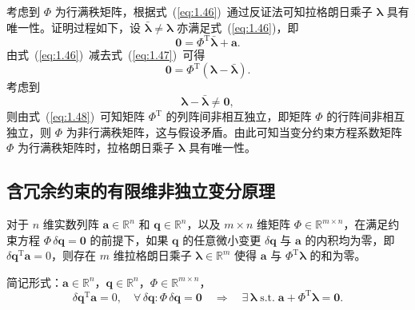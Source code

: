 考虑到 $\Phi$ 为行满秩矩阵，根据式~(\ref{eq:1.46})~通过反证法可知拉格朗日乘子 $\boldsymbol{\lambda}$ 具有唯一性。证明过程如下，设 $\bar{\boldsymbol{\lambda}} \neq \boldsymbol{\lambda}$ 亦满足式~(\ref{eq:1.46})，即
\begin{equation}\label{eq:1.47}
\boldsymbol{0} = \Phi^{\mathrm{T}} \bar{\boldsymbol{\lambda}} + \boldsymbol{a}.
\end{equation}
由式~(\ref{eq:1.46})~减去式~(\ref{eq:1.47})~可得
\begin{equation}\label{eq:1.48}
\boldsymbol{0} = \Phi^{\mathrm{T}} (\boldsymbol{\lambda} - \bar{\boldsymbol{\lambda}}).
\end{equation}
考虑到
\begin{equation}\label{eq:1.49}
\boldsymbol{\lambda} - \bar{\boldsymbol{\lambda}} \neq \boldsymbol{0},
\end{equation}
则由式~(\ref{eq:1.48})~可知矩阵 $\Phi^{\mathrm{T}}$ 的列阵间非相互独立，即矩阵 $\Phi$ 的行阵间非相互独立，则 $\Phi$ 为非行满秩矩阵，这与假设矛盾。由此可知当变分约束方程系数矩阵 $\Phi$ 为行满秩矩阵时，拉格朗日乘子 $\boldsymbol{\lambda}$ 具有唯一性。

\subsection{含冗余约束的有限维非独立变分原理}

\begin{theorem}[含冗余约束的有限维非独立变分原理]
对于 $n$ 维实数列阵 $\boldsymbol{a} \in \mathbb{R}^n$ 和 $\boldsymbol{q} \in \mathbb{R}^n$，以及 $m \times n$ 维矩阵 $\Phi \in \mathbb{R}^{m \times n}$，在满足约束方程 $\Phi\,\delta\boldsymbol{q} = \boldsymbol{0}$ 的前提下，如果 $\boldsymbol{q}$ 的任意微小变更 $\delta\boldsymbol{q}$ 与 $\boldsymbol{a}$ 的内积均为零，即 $\delta\boldsymbol{q}^{\mathrm{T}} \boldsymbol{a} = 0$，则存在 $m$ 维拉格朗日乘子 $\boldsymbol{\lambda} \in \mathbb{R}^m$ 使得 $\boldsymbol{a}$ 与 $\Phi^{\mathrm{T}} \boldsymbol{\lambda}$ 的和为零。
\end{theorem}

\noindent 简记形式：$\boldsymbol{a} \in \mathbb{R}^n$，$\boldsymbol{q} \in \mathbb{R}^n$，$\Phi \in \mathbb{R}^{m \times n}$，
\begin{equation}\label{eq:1.50}
\delta\boldsymbol{q}^{\mathrm{T}} \boldsymbol{a} = 0, \quad \forall\, \delta\boldsymbol{q} : \Phi\,\delta\boldsymbol{q} = \boldsymbol{0} \quad \Rightarrow \quad \exists\, \boldsymbol{\lambda} \;\text{s.t.}\; \boldsymbol{a} + \Phi^{\mathrm{T}} \boldsymbol{\lambda} = \boldsymbol{0}.
\end{equation}


